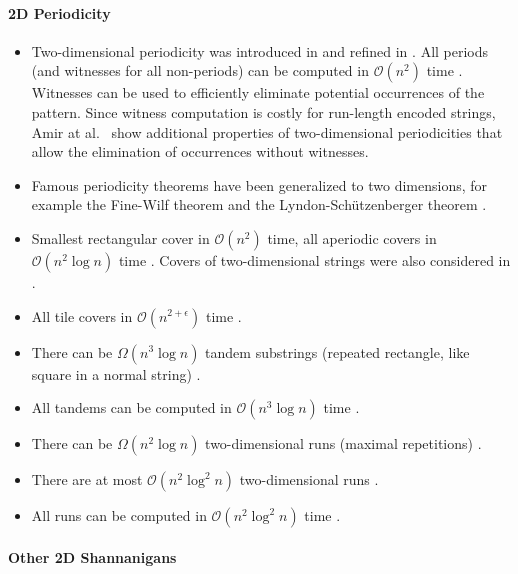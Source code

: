 \documentclass[11pt]{article}
\renewcommand{\O}{\mathcal{O}}
\theoremstyle{plain}
\theoremstyle{definition}
\theoremstyle{remark}
\begin{document}
\paragraph{2D Periodicity}

\begin{itemize}
	\item Two-dimensional periodicity was introduced in \cite{Amir1992,Amir1998} and refined in \cite{Galil1996}. All periods (and witnesses for all non-periods) can be computed in $\O(n^2)$ time \cite{Cole2004}. Witnesses can be used to efficiently eliminate potential occurrences of the pattern. Since witness computation is costly for run-length encoded strings, Amir at al.\ \cite{Amir1997} show additional properties of two-dimensional periodicities that allow the elimination of occurrences without witnesses.
	\item Famous periodicity theorems have been generalized to two dimensions, for example the Fine-Wilf theorem \cite{Fine1965,Mignosi2003} and the Lyndon-Schützenberger theorem \cite{Lyndon1962,Gamard2017}.
	\item Smallest rectangular cover in $\O(n^2)$ time, all aperiodic covers in $\O(n^2 \log n)$ time \cite{Charalampopoulos2021}. Covers of two-dimensional strings were also considered in \cite{Gamard2019,Crochemore1998a}. 
	\item All tile covers in $\O(n^{2+\epsilon})$ time \cite{Radoszewski2022}.
	\item There can be $\Omega(n^3 \log n)$ tandem substrings (repeated rectangle, like square in a normal string) \cite{Apostolico2000}.
	\item All tandems can be computed in $\O(n^3 \log n)$ time \cite{Apostolico2005}.
	\item There can be $\Omega(n^2 \log n)$ two-dimensional runs (maximal repetitions) \cite{Gawrychowski2021}.
	\item There are at most $\O(n^2 \log^2 n)$ two-dimensional runs \cite{Charalampopoulos2020}.
	\item All runs can be computed in $\O(n^2 \log^2 n)$ time \cite{Amir2020}.

\end{itemize}

\paragraph{Other 2D Shannanigans}
\end{document}
